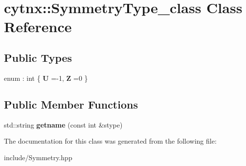 \hypertarget{classcytnx_1_1SymmetryType__class}{}\section{cytnx\+:\+:Symmetry\+Type\+\_\+class Class Reference}
\label{classcytnx_1_1SymmetryType__class}
\subsection*{Public Types}
\begin{DoxyCompactItemize}
\item 
\mbox{\label{classcytnx_1_1SymmetryType__class_aae6ac3b8a3fd4c22e91d70a8516dc389}} 
enum \+: int \{ {\bfseries U} =-\/1, 
{\bfseries Z} =0
 \}
\end{DoxyCompactItemize}
\subsection*{Public Member Functions}
\begin{DoxyCompactItemize}
\item 
\mbox{\label{classcytnx_1_1SymmetryType__class_a7d378dd8a33207850918f94695d56abc}} 
std\+::string {\bfseries getname} (const int \&stype)
\end{DoxyCompactItemize}


The documentation for this class was generated from the following file\+:\begin{DoxyCompactItemize}
\item 
include/Symmetry.\+hpp\end{DoxyCompactItemize}
